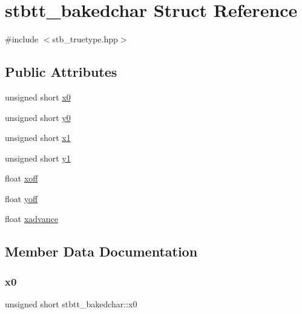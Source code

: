 \hypertarget{structstbtt__bakedchar}{}\section{stbtt\+\_\+bakedchar Struct Reference}
\label{structstbtt__bakedchar}


{\ttfamily \#include $<$stb\+\_\+truetype.\+hpp$>$}

\subsection*{Public Attributes}
\begin{DoxyCompactItemize}
\item 
unsigned short \hyperlink{structstbtt__bakedchar_a8011a0ed0410de9fa405c9cb1ab43da2}{x0}
\item 
unsigned short \hyperlink{structstbtt__bakedchar_aec4def12c086e0038ba32ff33ee78644}{y0}
\item 
unsigned short \hyperlink{structstbtt__bakedchar_a72c22c32abde95a5ba02925b8bd892bf}{x1}
\item 
unsigned short \hyperlink{structstbtt__bakedchar_ac831dc667f6c39b5d22740c6cbd5bc3f}{y1}
\item 
float \hyperlink{structstbtt__bakedchar_a0708a6588a2768b68a3ae59002944b7c}{xoff}
\item 
float \hyperlink{structstbtt__bakedchar_aba01393e52d1c6f4ce86a8b51e498bb4}{yoff}
\item 
float \hyperlink{structstbtt__bakedchar_ad77b35d1a849d9eb7edb91df05b10536}{xadvance}
\end{DoxyCompactItemize}


\subsection{Member Data Documentation}
\hypertarget{structstbtt__bakedchar_a8011a0ed0410de9fa405c9cb1ab43da2}{}\label{structstbtt__bakedchar_a8011a0ed0410de9fa405c9cb1ab43da2} 
\subsubsection{\texorpdfstring{x0}{x0}}
{\footnotesize\ttfamily unsigned short stbtt\+\_\+bakedchar\+::x0}

\hypertarget{structstbtt__bakedchar_a72c22c32abde95a5ba02925b8bd892bf}{}\label{structstbtt__bakedchar_a72c22c32abde95a5ba02925b8bd892bf} 
